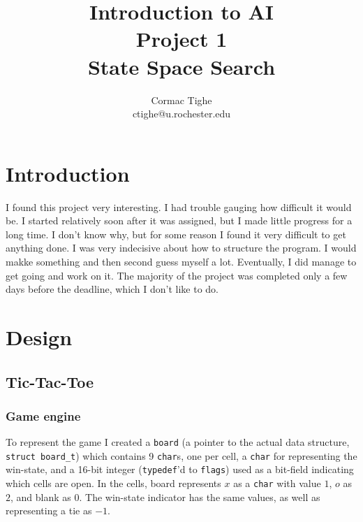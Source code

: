 \documentclass{article}
\title{Introduction to AI\\Project 1\\State Space Search}
\author{Cormac Tighe\\ctighe@u.rochester.edu}
\date{}
\begin{document}
\maketitle
\section{Introduction}
I found this project very interesting. I had trouble gauging how difficult it would be. I started relatively soon after it was assigned, but I made little progress for a long time.
I don't know why, but for some reason I found it very difficult to get anything done. I was very indecisive about how to structure the program. I would makke something and then second guess myself a lot.
Eventually, I did manage to get going and work on it. The majority of the project was completed only a few days before the deadline, which I don't like to do.

\section{Design}

\subsection{Tic-Tac-Toe}

\subsubsection{Game engine}

To represent the game I created a \texttt{board} (a pointer to the actual data structure, \texttt{struct board\_t}) which contains 9 \texttt{char}s, one per cell, a \texttt{char} for representing the win-state, and 
a 16-bit integer (\texttt{typedef}'d to \texttt{flags}) used as a bit-field indicating which cells are open. In the cells, board represents $x$ as a \texttt{char} with value $1$, $o$ as $2$, and blank as $0$. The win-state indicator
has the same values, as well as representing a tie as $-1$.
\end{document}
